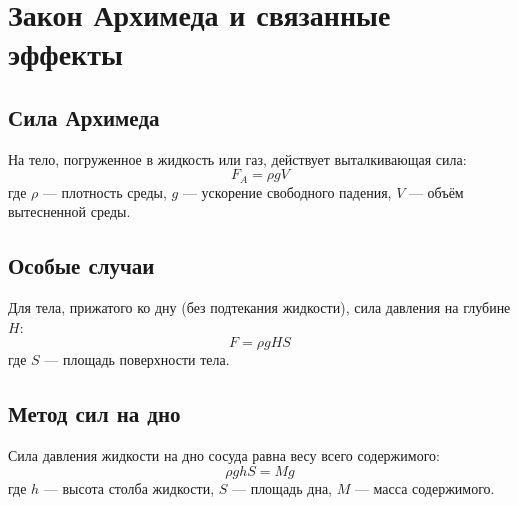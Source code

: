 \documentclass{article}
\begin{document}
\section*{Закон Архимеда и связанные эффекты}

\subsection*{Сила Архимеда}
На тело, погруженное в жидкость или газ, действует выталкивающая сила:
\[F_A = \rho gV\]
где $\rho$ — плотность среды, $g$ — ускорение свободного падения, $V$ — объём вытесненной среды.

\subsection*{Особые случаи}
Для тела, прижатого ко дну (без подтекания жидкости), сила давления на глубине $H$:
\[F = \rho gHS\]
где $S$ — площадь поверхности тела.

\subsection*{Метод сил на дно}
Сила давления жидкости на дно сосуда равна весу всего содержимого:
\[\rho ghS = Mg\]
где $h$ — высота столба жидкости, $S$ — площадь дна, $M$ — масса содержимого.
\end{document}
